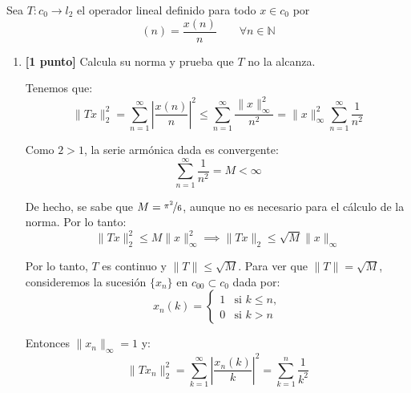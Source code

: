 \documentclass[12pt]{article}
\begin{document}
    \begin{ejercicio}[2 puntos]
        Sea $T:c_0\to l_2$ el operador lineal definido para todo $x\in c_0$ por
        \begin{equation*}
            [Tx](n) = \frac{x(n)}{n}\qquad \forall n\in \mathbb{N}
        \end{equation*}
        \begin{enumerate}[label=\alph*)]
            \item \textbf{[1 punto]} Calcula su norma y prueba que $T$ no la alcanza.
            
            Tenemos que:
            \begin{equation*}
                \|Tx\|_2^2 = \sum_{n=1}^{\infty} \left|\frac{x(n)}{n}\right|^2 \leq \sum_{n=1}^{\infty} \frac{\|x\|_\infty^2}{n^2} = \|x\|_\infty^2 \sum_{n=1}^{\infty} \frac{1}{n^2}
            \end{equation*}

            Como $2>1$, la serie armónica dada es convergente:
            \begin{equation*}
                \sum_{n=1}^{\infty} \frac{1}{n^2} = M<\infty
            \end{equation*}

            De hecho, se sabe que $M = \nicefrac{\pi^2}{6}$, aunque no es necesario para el cálculo de la norma. Por lo tanto:
            \begin{equation*}
                \|Tx\|_2^2 \leq M\|x\|_\infty^2 \implies \|Tx\|_2 \leq \sqrt{M}\|x\|_\infty
            \end{equation*}

            Por lo tanto, $T$ es continuo y $\|T\| \leq \sqrt{M}$. Para ver que $\|T\| = \sqrt{M}$, consideremos la sucesión $\{x_n\}$ en $c_{00}\subset c_0$ dada por:
            \begin{equation*}
                x_n(k) = \begin{cases}
                    1 & \text{si } k\leq n, \\
                    0 & \text{si } k>n
                \end{cases}
            \end{equation*}

            Entonces $\|x_n\|_\infty = 1$ y:
            \begin{equation*}
                \|Tx_n\|_2^2 = \sum_{k=1}^{\infty} \left|\frac{x_n(k)}{k}\right|^2 = \sum_{k=1}^{n} \frac{1}{k^2}
            \end{equation*}


\end{enumerate}
\end{ejercicio}
\end{document}
